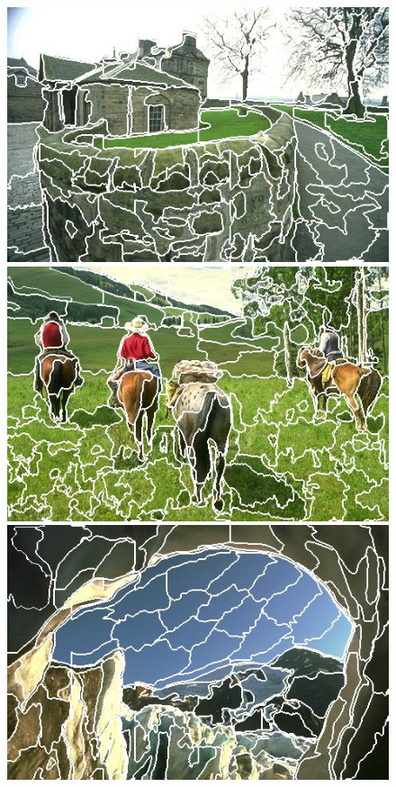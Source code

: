 \begin{figure}[h]
{\begin{minipage}[b]{0.13\linewidth}
\includegraphics[width=1\linewidth]{figures/img/SSN/SSN_92014.jpg}
\includegraphics[width=1\linewidth]{figures/img/SSN/SSN_220003.jpg}
\includegraphics[width=1\linewidth]{figures/img/SSN/SSN_176051.jpg}

\end{minipage}}
\end{figure}
